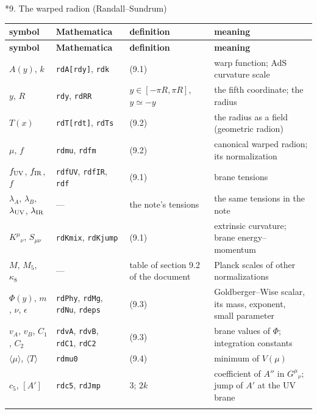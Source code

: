 \documentclass[10pt,a4paper]{article}
\makeatletter
\renewcommand\section{\@startsection{section}{1}{\z@}{-3.5ex \@plus -1ex \@minus -.2ex}{2.3ex \@plus.2ex}{\normalfont\Large\bfseries\raggedright}}
\makeatother
\begin{document}
\section*{9. The warped radion (Randall–Sundrum)}
{\footnotesize
\begin{longtable}{>{\raggedright\arraybackslash}p{}>{\raggedright\arraybackslash}p{}>{\raggedright\arraybackslash}p{}>{\raggedright\arraybackslash}p{}}
\toprule
\textbf{symbol} & \textbf{Mathematica} & \textbf{definition} & \textbf{meaning} \\
\midrule\endfirsthead
\toprule
\textbf{symbol} & \textbf{Mathematica} & \textbf{definition} & \textbf{meaning} \\
\midrule\endhead
\endfoot
\bottomrule\endlastfoot
$A(y)$, $k$ & \texttt{rdA[rdy]}, \texttt{rdk} & (9.1) & warp function; AdS curvature scale \\
$y$, $R$ & \texttt{rdy}, \texttt{rdRR} & $y\in[-\pi R,\pi R]$, $y\simeq-y$ & the fifth coordinate; the radius \\
$T(x)$ & \texttt{rdT[rdt]}, \texttt{rdTs} & (9.2) & the radius as a field (geometric radion) \\
$\mu$, $f$ & \texttt{rdmu}, \texttt{rdfm} & (9.2) & canonical warped radion; its normalization \\
$f_{\rm UV}$, $f_{\rm IR}$, $f$ & \texttt{rdfUV}, \texttt{rdfIR}, \texttt{rdf} & (9.1) & brane tensions \\
$\lambda_A$, $\lambda_B$, $\lambda_{\rm UV}$, $\lambda_{\rm IR}$ & — & the note’s tensions & the same tensions in the note \\
$K^\mu{}_\nu$, $S_{\mu\nu}$ & \texttt{rdKmix}, \texttt{rdKjump} & (9.1) & extrinsic curvature; brane energy–momentum \\
$M$, $M_5$, $\kappa_8$ & — & table of section 9.2 of the document & Planck scales of other normalizations \\
$\Phi(y)$, $m$, $\nu$, $\epsilon$ & \texttt{rdPhy}, \texttt{rdMg}, \texttt{rdNu}, \texttt{rdeps} & (9.3) & Goldberger–Wise scalar, its mass, exponent, small parameter \\
$v_A$, $v_B$, $C_1$, $C_2$ & \texttt{rdvA}, \texttt{rdvB}, \texttt{rdC1}, \texttt{rdC2} & (9.3) & brane values of $\Phi$; integration constants \\
$\langle\mu\rangle$, $\langle T\rangle$ & \texttt{rdmu0} & (9.4) & minimum of $V(\mu)$ \\
$c_5$, $[A']$ & \texttt{rdc5}, \texttt{rdJmp} & $3$; $2k$ & coefficient of $A''$ in $G^\mu{}_\nu$; jump of $A'$ at the UV brane \\*
\end{longtable}}
\end{document}
